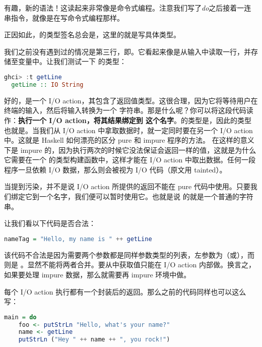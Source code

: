 \documentclass[./main.tex]{subfiles}
\begin{document}
有趣，新的语法！这读起来非常像是命令式编程。注意我们写了\textit{do}之后接着一连串指令，就像是在写命令式编程那样。

正因如此，的类型签名总会是，这里的就是写具体类型。

我们之前没有遇到过的情况是第三行，即。它看起来像是从输入中读取一行，并存储至变量中。让我们测试一下
的类型：

\begin{lstlisting}[language=Haskell]
  ghci> :t getLine
  getLine :: IO String
\end{lstlisting}

好的，是一个 I/O action，其包含了返回值类型。这很合理，因为它将等待用户在终端的输入，然后将输入转换为一个
字符串。那是什么呢？你可以将这段代码读作：\textbf{执行一个 I/O action，将其结果绑定到
  这个名字}。的类型是，因此的类型也就是。当我们从 I/O
action 中拿取数据时，就一定同时要在另一个 I/O action 中。这就是 Haskell 如何漂亮的区分 pure 和 impure 程序的方法。
在这样的意义下是 impure 的，因为执行两次的时候它没法保证会返回一样的值，这就是为什么它需要在一个  的类型构建函数中，这样才能在
I/O action 中取出数据。任何一段程序一旦依赖 I/O 数据，那么则会被视为 I/O 代码（原文用 tainted）。

当提到污染，并不是说 I/O action 所提供的返回不能在 pure 代码中使用。只要我们绑定它到一个名字，我们便可以暂时使用它。也就是说
的就是一个普通的字符串。

让我们看以下代码是否合法：

\begin{lstlisting}[language=Haskell]
  nameTag = "Hello, my name is " ++ getLine
\end{lstlisting}

该代码不合法是因为\acode{++}需要两个参数都是同样参数类型的列表，左参数为（或\acode{[Char]}），而则是
。显然不能将两者合并。要从中获取值只能在 I/O action 内部做。换言之，
如果要处理 impure 数据，那么就需要再 impure 环境中做。

每个 I/O action 执行都有一个封装后的返回。那么之前的代码同样也可以这么写：

\begin{lstlisting}[language=Haskell]
  main = do
    foo <- putStrLn "Hello, what's your name?"
    name <- getLine
    putStrLn ("Hey " ++ name ++ ", you rock!")
\end{lstlisting}
\end{document}
